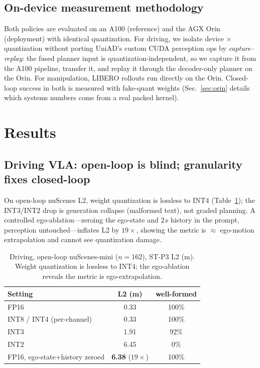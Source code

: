 \documentclass[conference]{IEEEtran}
\begin{document}
\subsection{On-device measurement methodology}
Both policies are evaluated on an A100 (reference) and the AGX Orin (deployment) with identical
quantization. For driving, we isolate device$\,\times\,$quantization without porting UniAD's custom
CUDA perception ops by \emph{capture--replay}: the fused planner input is quantization-independent, so
we capture it from the A100 pipeline, transfer it, and replay it through the decoder-only planner on
the Orin. For manipulation, LIBERO rollouts run directly on the Orin. Closed-loop success in both is
measured with fake-quant weights (Sec.~\ref{sec:orin} details which systems numbers come from a real
packed kernel).

\section{Results}
\subsection{Driving VLA: open-loop is blind; granularity fixes closed-loop}
On open-loop nuScenes L2, weight quantization is lossless to INT4 (Table~\ref{tab:drive-openloop});
the INT3/INT2 drop is generation collapse (malformed text), not graded planning. A controlled
ego-ablation---zeroing the ego-state and $2$\,s history in the prompt, perception untouched---inflates
L2 by $19\times$, showing the metric is $\approx$ ego-motion extrapolation and cannot see
quantization damage.

\begin{table}[t]\centering
\caption{Driving, open-loop nuScenes-mini ($n{=}162$), ST-P3 L2 (m). Weight quantization is lossless
to INT4; the ego-ablation reveals the metric is ego-extrapolation.}
\label{tab:drive-openloop}
\begin{tabular}{lcc}
\toprule
Setting & L2 (m) & well-formed \\
\midrule
FP16 & 0.33 & 100\% \\
INT8 / INT4 (per-channel) & 0.33 & 100\% \\
INT3 & 1.91 & 92\% \\
INT2 & 6.45 & 0\% \\
\midrule
FP16, ego-state+history zeroed & \textbf{6.38} ($19\times$) & 100\% \\
\bottomrule
\end{tabular}
\end{table}
\end{document}
